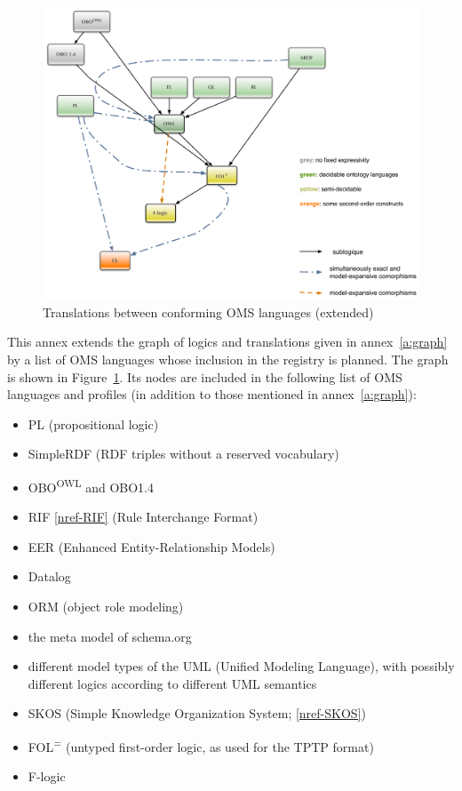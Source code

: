 \documentclass[10pt, a4paper]{isov2}
\renewcommand{\annexrefname}{annex}
\renewcommand{\figurerefname}{Figure}
\renewcommand{\noterefname}{note}
\renewcommand{\aref}[1]{\annexrefname~\ref{#1}}
\renewcommand{\fref}[1]{\figurerefname~\ref{#1}}
\renewcommand{\nref}[1]{\noterefname~\ref{#1}}
\renewcommand{\nref}[1]{\ref{nref-#1}}
\begin{document}
\begin{figure}
  \centering
  \includegraphics[width=\textwidth]{illustrations/pre-reduced-ontograph}
  \caption{Translations between conforming OMS languages (extended)}
  \label{fig:pre-ontograph}
\end{figure}
This annex extends the graph of logics and translations given in
\aref{a:graph} by a list of OMS languages  whose inclusion in
the registry is planned.  The graph is shown in
\fref{fig:pre-ontograph}.  Its nodes are included in the following
list of OMS languages and profiles (in addition to those
mentioned in \aref{a:graph}):
\begin{itemize}
\item PL (propositional logic)
\item SimpleRDF (RDF triples without a reserved vocabulary)
\item OBO\textsuperscript{OWL} and OBO1.4
\item RIF \nref{RIF} (Rule Interchange Format)
\item EER (Enhanced Entity-Relationship Models) %
\item Datalog
\item ORM (object role modeling)
\item the meta model of schema.org
\item different model types of the UML (Unified Modeling Language), with possibly different logics according to different
UML semantics
\item SKOS (Simple Knowledge Organization System; \nref{SKOS})
\item FOL\textsuperscript{=} (untyped first-order logic, as used for the
TPTP format)
\item F-logic
\end{itemize}
\end{document}
